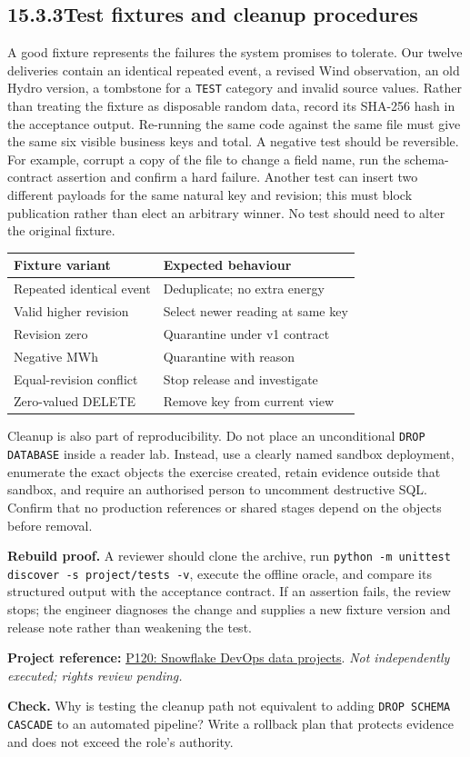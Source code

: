 \documentclass[11pt,twoside]{article}
\newcommand{\topic}[2]{\subsection*{#1\quad #2}}
\newcommand{\repo}[2]{\par\begingroup\fontsize{8.0}{9.6}\selectfont\sffamily\color{inkgray}\textbf{Project reference:} \href{#2}{#1}. \textit{Not independently executed; rights review pending.}\par\endgroup}
\begin{document}
\newpage

\topic{15.3.3}{Test fixtures and cleanup procedures}
A good fixture represents the failures the system promises to tolerate. Our twelve deliveries contain an identical repeated event, a revised Wind observation, an old Hydro version, a tombstone for a \texttt{TEST} category and invalid source values. Rather than treating the fixture as disposable random data, record its SHA-256 hash in the acceptance output. Re-running the same code against the same file must give the same six visible business keys and total.
A negative test should be reversible. For example, corrupt a copy of the file to change a field name, run the schema-contract assertion and confirm a hard failure. Another test can insert two different payloads for the same natural key and revision; this must block publication rather than elect an arbitrary winner. No test should need to alter the original fixture.
\begin{center}\small\begin{tabularx}{\linewidth}{@{}p{33mm}X@{}}\toprule
Fixture variant & Expected behaviour\\\midrule
Repeated identical event & Deduplicate; no extra energy\\
Valid higher revision & Select newer reading at same key\\
Revision zero & Quarantine under v1 contract\\
Negative MWh & Quarantine with reason\\
Equal-revision conflict & Stop release and investigate\\
Zero-valued DELETE & Remove key from current view\\\bottomrule\end{tabularx}\end{center}
Cleanup is also part of reproducibility. Do not place an unconditional \texttt{DROP DATABASE} inside a reader lab. Instead, use a clearly named sandbox deployment, enumerate the exact objects the exercise created, retain evidence outside that sandbox, and require an authorised person to uncomment destructive SQL. Confirm that no production references or shared stages depend on the objects before removal.
\begin{whitebox}\textbf{Rebuild proof.} A reviewer should clone the archive, run \texttt{python -m unittest discover -s project/tests -v}, execute the offline oracle, and compare its structured output with the acceptance contract. If an assertion fails, the review stops; the engineer diagnoses the change and supplies a new fixture version and release note rather than weakening the test.\end{whitebox}
\repo{P120: Snowflake DevOps data projects}{https://github.com/Snowflake-Labs/sfguide-getting-started-with-devops-data-projects-in-snowflake}
\textbf{Check.} Why is testing the cleanup path not equivalent to adding \texttt{DROP SCHEMA CASCADE} to an automated pipeline? Write a rollback plan that protects evidence and does not exceed the role's authority.
\end{document}
